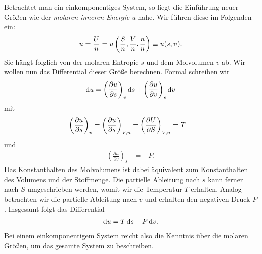 Betrachtet man ein einkomponentiges System, so liegt die Einführung neuer Größen wie der \emph{molaren inneren Energie} $u$ nahe. Wir führen diese im Folgenden ein:
\begin{align*}
    u=\frac{U}{n}=u\left(\frac{S}{n},\frac{V}{n},\frac{n}{n}\right)\equiv u(s,v).
\end{align*}
Sie hängt folglich von der molaren Entropie $s$ und dem Molvolumen $v$ ab.
Wir wollen nun das Differential dieser Größe berechnen. Formal schreiben wir
\begin{align*}
    \mathop{}\!\mathrm{d} u = \left(\frac{\partial u}{\partial s}\right)_v \mathop{}\!\mathrm{d} s + \left(\frac{\partial u}{\partial v}\right)_s\mathop{}\!\mathrm{d} v
\end{align*}
mit
\begin{align*}
    \left( \frac{\partial u}{\partial s} \right)_v=\left( \frac{\partial u}{\partial s} \right)_{V,n} & =\left( \frac{\partial U}{\partial S} \right)_{V,n} =T
\end{align*}
und
\begin{align*}
    \left(\frac{\partial u}{\partial v}\right)_s & = -P.
\end{align*}
Das Konstanthalten des Molvolumens ist dabei äquivalent zum Konstanthalten des Volumens und der Stoffmenge. Die partielle Ableitung nach $s$ kann ferner nach $S$ umgeschrieben werden, womit wir die Temperatur $T$ erhalten.
Analog betrachten wir die partielle Ableitung nach $v$ und erhalten den negativen Druck $P$.
Insgesamt folgt das Differential
\begin{align*}
    \mathop{}\!\mathrm{d} u = T\mathop{}\!\mathrm{d} s -P\mathop{}\!\mathrm{d} v.
\end{align*}
Bei einem einkomponentigem System reicht also die Kenntnis über die molaren Größen, um das gesamte System zu beschreiben.

